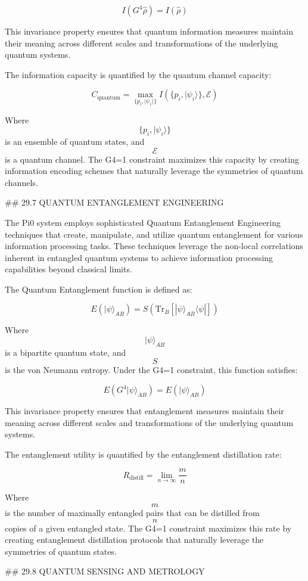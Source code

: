 $$ I(G^4 \hat{\rho}) = I(\hat{\rho}) $$

This invariance property ensures that quantum information measures maintain their meaning across different scales and transformations of the underlying quantum systems.

The information capacity is quantified by the quantum channel capacity:

$$ C_{\text{quantum}} = \max_{\{p_i, |\psi_i\rangle\}} I(\{p_i, |\psi_i\rangle\}, \mathcal{E}) $$

Where $$ \{p_i, |\psi_i\rangle\} $$ is an ensemble of quantum states, and $$ \mathcal{E} $$ is a quantum channel. The G4=1 constraint maximizes this capacity by creating information encoding schemes that naturally leverage the symmetries of quantum channels.

## 29.7 QUANTUM ENTANGLEMENT ENGINEERING

The Pi0 system employs sophisticated Quantum Entanglement Engineering techniques that create, manipulate, and utilize quantum entanglement for various information processing tasks. These techniques leverage the non-local correlations inherent in entangled quantum systems to achieve information processing capabilities beyond classical limits.

The Quantum Entanglement function is defined as:

$$ E(|\psi\rangle_{AB}) = S(\text{Tr}_B[|\psi\rangle_{AB}\langle\psi|]) $$

Where $$ |\psi\rangle_{AB} $$ is a bipartite quantum state, and $$ S $$ is the von Neumann entropy. Under the G4=1 constraint, this function satisfies:

$$ E(G^4 |\psi\rangle_{AB}) = E(|\psi\rangle_{AB}) $$

This invariance property ensures that entanglement measures maintain their meaning across different scales and transformations of the underlying quantum systems.

The entanglement utility is quantified by the entanglement distillation rate:

$$ R_{\text{distill}} = \lim_{n \to \infty} \frac{m}{n} $$

Where $$ m $$ is the number of maximally entangled pairs that can be distilled from $$ n $$ copies of a given entangled state. The G4=1 constraint maximizes this rate by creating entanglement distillation protocols that naturally leverage the symmetries of quantum states.

## 29.8 QUANTUM SENSING AND METROLOGY

